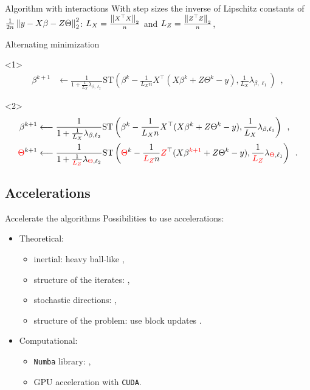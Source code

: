 \documentclass[10pt,aspectratio=43]{beamer}
\begin{document}
\begin{frame}{Algorithm with interactions}
With step sizes the inverse of Lipschitz constants of
$\frac{1}{2n}\left \lVert y-X\beta - Z\Theta \right \rVert_2^2$: $L_X=\frac{\left \lVert X^\top X \right \rVert_2}{n}$
and $L_Z = \frac{\left \lVert Z^\top Z \right \rVert_2}{n}$,

\begin{block}{Alternating minimization}
\begin{onlyenv}<1>
\begin{align*}
\beta^{k+1} &\longleftarrow \frac{1}{1 +
\frac{1}{L_X} \lambda_{\beta, \ell_2}}
\mathrm{ST}
\left(\beta^k - \frac{1}{L_X n}
 X^\top (X\beta^{k} + Z\Theta^k - y),
\frac{1}{L_X}\lambda_{\beta, \ell_1}
\right) \enspace,
\end{align*}
\end{onlyenv}
\begin{onlyenv}<2>
\begin{align*}
\beta^{k+1} &\longleftarrow \frac{1}{1 +
\frac{1}{L_X} \lambda_{\beta, \ell_2}}
\mathrm{ST}
\left(\beta^k - \frac{1}{L_X n}
 X^\top (X\beta^{k} + Z\Theta^k - y),
\frac{1}{L_X}\lambda_{\beta, \ell_1}
\right) \enspace, \\
\textcolor{red}{\Theta}^{k+1} & \longleftarrow \frac{1}{1 +
\frac{1}{\textcolor{red}{L_Z}} \lambda_{\textcolor{red}{\Theta}, \ell_2}}
\mathrm{ST}
\left( \textcolor{red}{\Theta}^k - \frac{1}{\textcolor{red}{L_Z} n}
\textcolor{red}{Z}^\top (X\beta^{\textcolor{red}{k+1}} + Z\Theta^k - y),
\frac{1}{\textcolor{red}{L_Z}}\lambda_{\textcolor{red}{\Theta}, \ell_1}
\right) \enspace.
\end{align*}
\end{onlyenv}
\end{block}
\end{frame}


\subsection{Accelerations}
\begin{frame}{Accelerate the algorithms}
Possibilities to use accelerations:
\begin{itemize}
    \setlength\itemsep{1em}
    \item Theoretical:
    \begin{itemize}
        \item inertial: heavy ball-like \citep{nesterov27method},
        \item structure of the iterates: \citep{bertrand2021anderson},
        \item stochastic directions: \citep{nesterov2012efficiency},
        \item structure of the problem: use block updates \citep{Beck17}.
    \end{itemize}
    \item Computational:
    \begin{itemize}
        \item \texttt{Numba} library: \citep{lam2015numba},
        \item GPU acceleration with \texttt{CUDA}.
    \end{itemize}
\end{itemize}
\end{frame}
\end{document}
